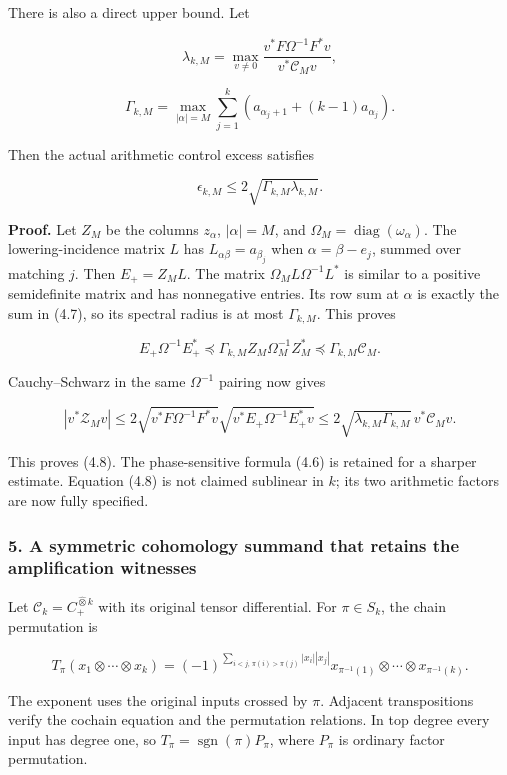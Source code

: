 There is also a direct upper bound. Let

\[\lambda_{k,M}=\max_{v\ne0}\frac{v^*F\Omega^{-1}F^*v}{v^*\mathcal C_Mv},\]

\[\Gamma_{k,M}=\max_{|\alpha|=M}\sum_{j=1}^k\left(a_{\alpha_j+1}+(k-1)a_{\alpha_j}\right).\tag{4.7}\]

Then the actual arithmetic control excess satisfies

\[\boxed{\epsilon_{k,M}\le2\sqrt{\Gamma_{k,M}\lambda_{k,M}}.}\tag{4.8}\]

\textbf{Proof.} Let \(Z_M\) be the columns \(z_\alpha\), \(|\alpha|=M\),
and \(\Omega_M=\operatorname{diag}(\omega_\alpha)\). The
lowering-incidence matrix \(L\) has \(L_{\alpha\beta}=a_{\beta_j}\) when
\(\alpha=\beta-e_j\), summed over matching \(j\). Then \(E_+=Z_ML\). The
matrix \(\Omega_ML\Omega^{-1}L^*\) is similar to a positive semidefinite
matrix and has nonnegative entries. Its row sum at \(\alpha\) is exactly
the sum in (4.7), so its spectral radius is at most \(\Gamma_{k,M}\).
This proves

\[E_+\Omega^{-1}E_+^*\preceq
\Gamma_{k,M}Z_M\Omega_M^{-1}Z_M^*
\preceq\Gamma_{k,M}\mathcal C_M.\]

Cauchy--Schwarz in the same \(\Omega^{-1}\) pairing now gives

\[|v^*\mathcal Z_Mv|
\le2\sqrt{v^*F\Omega^{-1}F^*v}\sqrt{v^*E_+\Omega^{-1}E_+^*v}
\le2\sqrt{\lambda_{k,M}\Gamma_{k,M}}\,v^*\mathcal C_Mv.\]

This proves (4.8). The phase-sensitive formula (4.6) is retained for a
sharper estimate. Equation (4.8) is not claimed sublinear in \(k\); its
two arithmetic factors are now fully specified.

\subsubsection{5. A symmetric cohomology summand that retains the
amplification
witnesses}\label{symmetric_frontier:a-symmetric-cohomology-summand-that-retains-the-amplification-witnesses}

Let \(\mathcal C_k=C_+^{\widehat\otimes k}\) with its original tensor
differential. For \(\pi\in S_k\), the chain permutation is

\[T_\pi(x_1\otimes\cdots\otimes x_k)
=(-1)^{\sum_{i<j,\,\pi(i)>\pi(j)}|x_i||x_j|}
 x_{\pi^{-1}(1)}\otimes\cdots\otimes x_{\pi^{-1}(k)}.\tag{5.1}\]

The exponent uses the original inputs crossed by \(\pi\). Adjacent
transpositions verify the cochain equation and the permutation
relations. In top degree every input has degree one, so
\(T_\pi=\operatorname{sgn}(\pi)P_\pi\), where \(P_\pi\) is ordinary
factor permutation.

